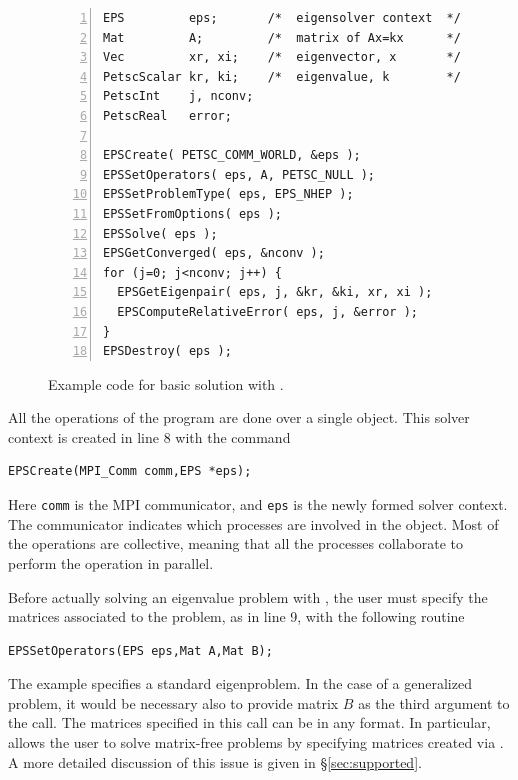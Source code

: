 \begin{figure}
\begin{Verbatim}[fontsize=\small,numbers=left,numbersep=6pt,xleftmargin=15mm]
EPS         eps;       /*  eigensolver context  */
Mat         A;         /*  matrix of Ax=kx      */
Vec         xr, xi;    /*  eigenvector, x       */
PetscScalar kr, ki;    /*  eigenvalue, k        */
PetscInt    j, nconv;
PetscReal   error;

EPSCreate( PETSC_COMM_WORLD, &eps );
EPSSetOperators( eps, A, PETSC_NULL );
EPSSetProblemType( eps, EPS_NHEP );
EPSSetFromOptions( eps );
EPSSolve( eps );
EPSGetConverged( eps, &nconv );
for (j=0; j<nconv; j++) {
  EPSGetEigenpair( eps, j, &kr, &ki, xr, xi );
  EPSComputeRelativeError( eps, j, &error );
}
EPSDestroy( eps );
\end{Verbatim}
\caption{\label{fig:ex-eps}Example code for basic solution with .}
\end{figure}

	All the operations of the program are done over a single  object. This solver context is created in line 8 with the command 
	\begin{Verbatim}[fontsize=\small]
	EPSCreate(MPI_Comm comm,EPS *eps);
	\end{Verbatim}
	Here \texttt{comm} is the MPI communicator, and \texttt{eps} is the newly formed solver context. The communicator indicates which processes are involved in the  object. Most of the  operations are collective, meaning that all the processes collaborate to perform the operation in parallel. 

	Before actually solving an eigenvalue problem with , the user must specify the matrices associated to the problem, as in line 9, with the following routine
	\begin{Verbatim}[fontsize=\small]
	EPSSetOperators(EPS eps,Mat A,Mat B);
	\end{Verbatim}
	The example specifies a standard eigenproblem. In the case of a generalized problem, it would be necessary also to provide matrix $B$ as the third argument to the call. The matrices specified in this call can be in any \petsc format. In particular,  allows the user to solve matrix-free problems by specifying matrices created via . A more detailed discussion of this issue is given in \S\ref{sec:supported}.

